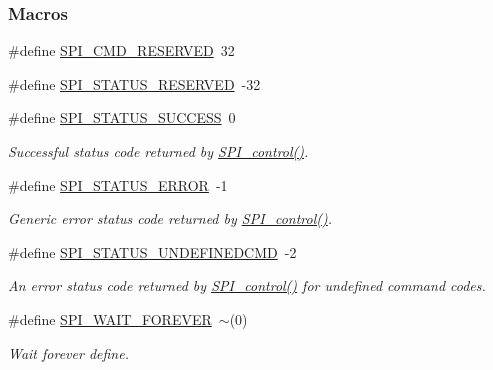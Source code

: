 \subsubsection*{Macros}
\begin{DoxyCompactItemize}
\item 
\#define \hyperlink{group___s_p_i___c_o_n_t_r_o_l_ga3d23d16525ee76f77276472d8dea80b0}{S\+P\+I\+\_\+\+C\+M\+D\+\_\+\+R\+E\+S\+E\+R\+V\+E\+D}~32
\item 
\#define \hyperlink{group___s_p_i___c_o_n_t_r_o_l_gae1af8c6ebf5e8fe481649f65e37b1b9f}{S\+P\+I\+\_\+\+S\+T\+A\+T\+U\+S\+\_\+\+R\+E\+S\+E\+R\+V\+E\+D}~-\/32
\item 
\#define \hyperlink{group___s_p_i___s_t_a_t_u_s_gab38fa90ff62128dbc98b2ecd84ca106f}{S\+P\+I\+\_\+\+S\+T\+A\+T\+U\+S\+\_\+\+S\+U\+C\+C\+E\+S\+S}~0
\begin{DoxyCompactList}\small\item\em Successful status code returned by \hyperlink{_s_p_i_8h_ab9d3a23991be2741f382749d3844cc2f}{S\+P\+I\+\_\+control()}. \end{DoxyCompactList}\item 
\#define \hyperlink{group___s_p_i___s_t_a_t_u_s_ga2d0020dd673cc28a9e1c20b0ff101073}{S\+P\+I\+\_\+\+S\+T\+A\+T\+U\+S\+\_\+\+E\+R\+R\+O\+R}~-\/1
\begin{DoxyCompactList}\small\item\em Generic error status code returned by \hyperlink{_s_p_i_8h_ab9d3a23991be2741f382749d3844cc2f}{S\+P\+I\+\_\+control()}. \end{DoxyCompactList}\item 
\#define \hyperlink{group___s_p_i___s_t_a_t_u_s_gacfcd15e1eecdb99b4867adc7592a8d6e}{S\+P\+I\+\_\+\+S\+T\+A\+T\+U\+S\+\_\+\+U\+N\+D\+E\+F\+I\+N\+E\+D\+C\+M\+D}~-\/2
\begin{DoxyCompactList}\small\item\em An error status code returned by \hyperlink{_s_p_i_8h_ab9d3a23991be2741f382749d3844cc2f}{S\+P\+I\+\_\+control()} for undefined command codes. \end{DoxyCompactList}\item 
\#define \hyperlink{_s_p_i_8h_a7cab73b936e6e08392882196df41277e}{S\+P\+I\+\_\+\+W\+A\+I\+T\+\_\+\+F\+O\+R\+E\+V\+E\+R}~$\sim$(0)
\begin{DoxyCompactList}\small\item\em Wait forever define. \end{DoxyCompactList}\end{DoxyCompactItemize}
